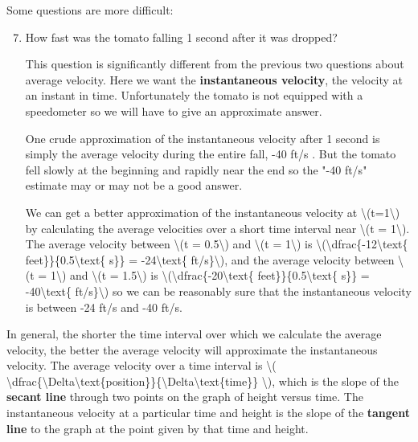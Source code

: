 Some questions are more difficult:

\begin{enumerate}
\setcounter{enumi}{6}
\item
  How fast was the tomato falling 1 second after it was dropped?

  This question is significantly different from the previous two
  questions about average velocity. Here we want the
  \textbf{instantaneous velocity}, the velocity at an instant in time.
  Unfortunately the tomato is not equipped with a speedometer so we will
  have to give an approximate answer.

  One crude approximation of the instantaneous velocity after 1 second
  is simply the average velocity during the entire fall, -40 ft/s . But
  the tomato fell slowly at the beginning and rapidly near the end so
  the "-40 ft/s" estimate may or may not be a good answer.

  We can get a better approximation of the instantaneous velocity at
  \textbackslash{}(t=1\textbackslash{}) by calculating the average
  velocities over a short time interval near \textbackslash{}(t =
  1\textbackslash{}). The average velocity between \textbackslash{}(t =
  0.5\textbackslash{}) and \textbackslash{}(t = 1\textbackslash{}) is
  \textbackslash{}(\textbackslash{}dfrac\{-12\textbackslash{}text\{
  feet\}\}\{0.5\textbackslash{}text\{ s\}\} = -24\textbackslash{}text\{
  ft/s\}\textbackslash{}), and the average velocity between
  \textbackslash{}(t = 1\textbackslash{}) and \textbackslash{}(t =
  1.5\textbackslash{}) is
  \textbackslash{}(\textbackslash{}dfrac\{-20\textbackslash{}text\{
  feet\}\}\{0.5\textbackslash{}text\{ s\}\} = -40\textbackslash{}text\{
  ft/s\}\textbackslash{}) so we can be reasonably sure that the
  instantaneous velocity is between -24 ft/s and -40 ft/s.
\end{enumerate}

In general, the shorter the time interval over which we calculate the
average velocity, the better the average velocity will approximate the
instantaneous velocity. The average velocity over a time interval is
\textbackslash{}(
\textbackslash{}dfrac\{\textbackslash{}Delta\textbackslash{}text\{position\}\}\{\textbackslash{}Delta\textbackslash{}text\{time\}\}
\textbackslash{}), which is the slope of the \textbf{secant line}
through two points on the graph of height versus time. The instantaneous
velocity at a particular time and height is the slope of the
\textbf{tangent line} to the graph at the point given by that time and
height.

